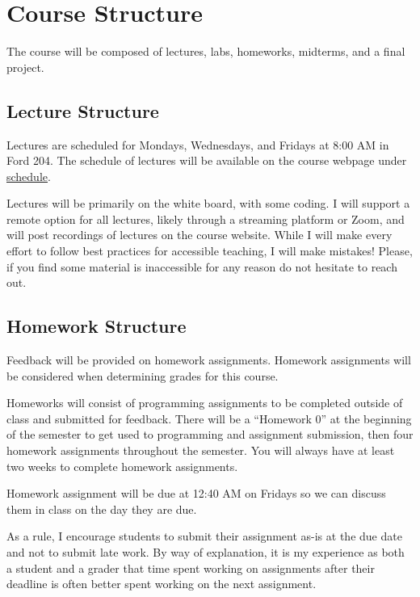 \documentclass[11pt]{article}
\begin{document}

\section*{Course Structure}

The course will be composed of lectures, labs, homeworks, midterms, and a final project.

\subsection*{Lecture Structure}

Lectures are scheduled for Mondays, Wednesdays, and Fridays at 8:00 AM in Ford 204. The schedule
of lectures will be available on the course webpage under \href{https://cd-public.github.io/courses/data_structures/s-241f21.html}{schedule}.

\bigskip
\noindent Lectures will be primarily on the white board, with some coding. I will support a remote option
for all lectures, likely through a streaming platform or Zoom, and will post recordings of lectures
on the course website. While I will make every effort to follow best practices for accessible teaching, I will make mistakes! Please, if you find some material is inaccessible for any reason
do not hesitate to reach out.

\subsection*{Homework Structure}

Feedback will be provided on homework assignments. Homework assignments will be considered when determining grades for this course.

\bigskip
\noindent Homeworks will consist of programming assignments to be completed outside of class and submitted
for feedback. There will be a ``Homework 0'' at the beginning of the semester to get used to
programming and assignment submission, then four homework assignments throughout the semester.
You will always have at least two weeks to complete homework assignments.

\bigskip
\noindent Homework assignment will be due at 12:40 AM on Fridays so we can discuss them in class on the 
day they are due.

\bigskip
\noindent As a rule, I encourage students to submit their assignment as-is at the due date and not to
submit late work. By way of explanation, it is my experience as both a student and a grader that time spent working on assignments after their deadline is often better spent working on the next assignment.
\end{document}
